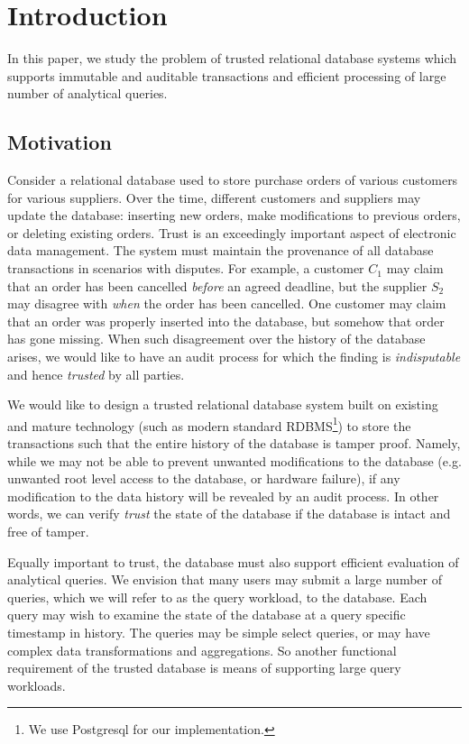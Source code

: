 \section{Introduction}

In this paper, we study the problem of trusted relational database systems which
supports immutable and auditable transactions and efficient processing of large
number of analytical queries.

\subsection{Motivation}

Consider a relational database
used to store purchase orders of various customers for various suppliers.  Over the time,
different customers and suppliers may update the database: inserting new orders, 
make modifications to previous orders, or deleting existing orders.  Trust is an
exceedingly important aspect of electronic data management. The system must
maintain the provenance of all database transactions in scenarios with disputes.
For example, a customer $C_1$ may claim that an order has been cancelled {\em
before} an agreed deadline, but the
supplier $S_2$ may disagree with {\em when} the order has been cancelled.  One
customer may claim that an order was properly inserted into the database, but
somehow that order has gone missing.  When such disagreement over the history
of the database arises, we would like to have an audit process for which the
finding is {\em indisputable} and hence {\em trusted} by all parties.

We would like to design a trusted relational database system built on existing
and mature technology (such as modern standard RDBMS\footnote{We use Postgresql
for our implementation.}) to store the transactions such that the entire history
of the database is tamper proof.  Namely, while we may not be able to prevent
unwanted modifications to the database (e.g. unwanted root level access to the
database, or hardware failure), if any modification to the data history will be
revealed by an audit process.  In other words, we can verify {\em trust} the
state of the database if the database is intact and free of tamper.

Equally important to trust, the database must also support efficient evaluation
of analytical queries.  We envision that many users may submit a large number of
queries, which we will refer to as the query workload, to the database.  Each
query may wish to examine the state of the database at a query specific timestamp
in history.  The queries may be simple select queries,
or may have complex data transformations and aggregations.  So another
functional requirement of the trusted database is means of supporting large
query workloads.

